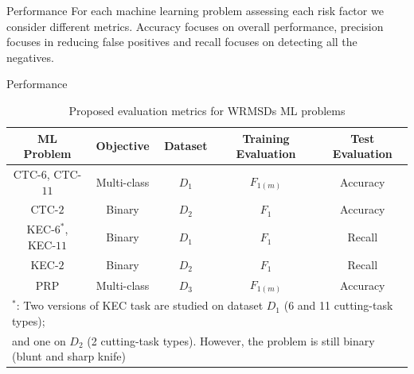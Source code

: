 \begin{frame}{Performance}
    For each machine learning problem assessing each risk factor we consider different metrics. Accuracy focuses on overall performance, precision focuses in
    reducing false positives and recall focuses on detecting all the negatives.
\end{frame}

\begin{frame}{Performance}
    \begin{table}[H]
        \centering
        \caption{Proposed evaluation metrics for WRMSDs ML problems}
        \begin{tabular}{cc|ccc}
            \toprule
            ML Problem  & Objective & Dataset & Training Evaluation & Test Evaluation \\
            \midrule
            CTC-$6$, CTC-$11$   & Multi-class & $D_1$ & $F_{1(m)}$    &Accuracy\\
            CTC-$2$            & Binary       & $D_2$ &  $F_1$     &Accuracy\\
            KEC-$6^*$, KEC-$11$  & Binary       &  $D_1$ & $F_1$     & Recall \\
            KEC-$2$            & Binary        & $D_2$ & $F_1$     & Recall\\
            PRP                 & Multi-class    & $D_3$ &   $F_{1(m)}$  & Accuracy\\
            \bottomrule
            \multicolumn{5}{l}{$^{*}$: Two versions of KEC task are studied on dataset $D_1$ (6 and 11 cutting-task types);}\\
                \multicolumn{5}{l}{ and one on $D_2$ (2 cutting-task types). However, the problem is still binary (blunt and sharp knife)}\\
        \end{tabular}
        \label{paper_table:evaluation_metrics_wrmsds}
    \end{table}
\end{frame}




